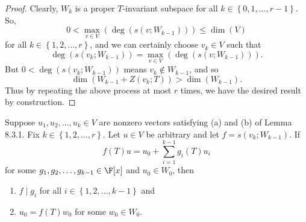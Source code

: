 \documentclass[linearalgebra]{subfiles}
\begin{document}
    \begin{proof}
        Clearly, $W_k$ is a proper $T$-invariant subspace for all $k\in \left\lbrace 0,1,\ldots,r-1 \right\rbrace$. So,
        \begin{equation*}
            0 < \max_{v\in V}\left( \deg\left( s\left( v;W_{k-1} \right)  \right)  \right) \leq \dim(V)
        \end{equation*}
        for all $k\in\left\lbrace 1,2,\ldots,r \right\rbrace$, and we can certainly choose $v_k\in V$ such that
        \begin{equation*}
            \deg\left( s\left( v_k;W_{k-1} \right)  \right) = \max_{v\in V} \left( \deg\left( s(v;W_{k-1}) \right)  \right) .
        \end{equation*}
        But $0<\deg\left( s(v_k;W_{k-1}) \right) $ means $v_k\notin W_{k-1}$, and so
        \begin{equation*}
            \dim\left( W_{k-1}+Z(v_k;T) \right) > \dim(W_{k-1}).
        \end{equation*}
        Thus by repeating the above process at most $r$ times, we have the desired result by construction.
    \end{proof}

    \begin{lemma_inside}{}
        Suppose $u_1,u_2,\ldots,u_k\in V$ are nonzero vectors satisfying (a) and (b) of Lemma 8.3.1. Fix $k\in \left\lbrace 1,2,\ldots,r \right\rbrace$. Let $u\in V$ be arbitrary and let $f=s(v_k;W_{k-1})$. If
        \begin{equation*}
            f(T)u = u_0 + \sum^{k-1}_{i=1} g_i(T)u_i
        \end{equation*}
        for some $g_1,g_2,\ldots,g_{k-1}\in\F[x]$ and $u_0\in W_0$, then
        \begin{enumerate}
            \item $f\mid g_i$ for all $i\in\left\lbrace 1,2,\ldots,k-1 \right\rbrace$ and
            \item $u_0=f(T)w_0$ for some $w_0\in W_0$.
        \end{enumerate}
    \end{lemma_inside}
\end{document}
